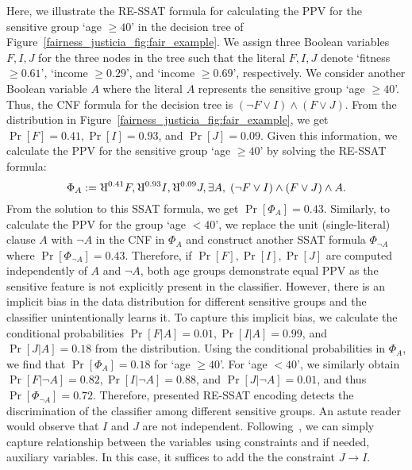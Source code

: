\begin{example}
	\label{fairness_justicia_example:re_ssat}
	Here, we illustrate the RE-SSAT formula for calculating the PPV for the sensitive group `age $ \ge 40 $' in the decision tree of Figure~\ref{fairness_justicia_fig:fair_example}. We assign three Boolean variables $ F,I,J $ for the three nodes in the tree such that the literal $ F,I,J $ denote `fitness $ \ge 0.61 $', `income $ \ge 0.29 $', and `income $ \ge 0.69 $', respectively. We consider another Boolean variable $A$  where the literal $ A $ represents the sensitive group `age $ \ge 40 $'. Thus, the CNF formula  for the decision tree is $ (\neg F \vee I) \wedge (F \vee J) $. From the distribution in Figure~\ref{fairness_justicia_fig:fair_example}, we get $ \Pr[F] = 0.41, \Pr[I] = 0.93 $, and $ \Pr[J] = 0.09 $. Given this information, we calculate the PPV for the sensitive group `age $ \ge 40 $' by solving the RE-SSAT formula:
	\begin{equation}
	\Phi_A := \R^{0.41}F, \R^{0.93}I, \R^{0.09}J, \exists A, \; (\neg F \vee I) \wedge (F \vee J) \wedge A.\notag
	\end{equation}
	From the solution to this SSAT formula, we get $ \Pr[\Phi_A] = 0.43 $. Similarly, to calculate the PPV for the group `age $ < 40 $', we replace the unit (single-literal) clause $ A $ with $ \neg A $ in the CNF in $ \Phi_A $ and construct another SSAT formula $ \Phi_{\neg A} $ where $ \Pr[\Phi_{\neg A}] = 0.43 $. 
	Therefore, if $\Pr[F], \Pr[I], \Pr[J]$ are computed independently of $A$ and $\neg A$, both age groups demonstrate equal PPV as the sensitive feature is not explicitly present in the classifier. 
	However, there is an implicit bias in the data distribution for different sensitive groups and the classifier unintentionally learns it. 
	To capture this implicit bias, we calculate the conditional probabilities  $ \Pr[F|A] = 0.01, \Pr[I|A] = 0.99 $, and $ \Pr[J|A] = 0.18 $ from the distribution. Using the conditional probabilities in  $\Phi_A $, we find that $ \Pr[\Phi_A] = 0.18 $ for `age $ \ge 40 $'. For `age $ < 40 $',  we similarly obtain $ \Pr[F|\neg A] = 0.82, \Pr[I|\neg A] = 0.88 $, and $ \Pr[J|\neg A] = 0.01 $, and thus  $ \Pr[\Phi_{\neg A}] = 0.72 $. 
	Therefore, presented RE-SSAT encoding detects the discrimination of the classifier among different sensitive groups. An astute reader would observe that $I$ and $J$ are not independent. Following~\cite{chavira2008probabilistic}, we can simply capture relationship between the variables using constraints and if needed, auxiliary variables. In this case, it suffices to add the the constraint $J \rightarrow I$. 
\end{example}

